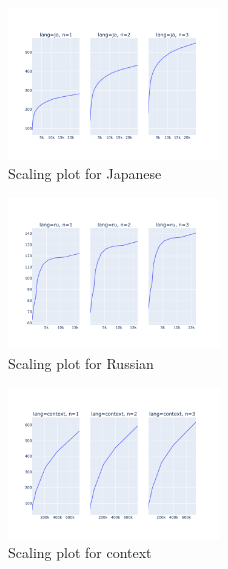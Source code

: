 \documentclass[11pt]{article}
\begin{document}
\begin{figure}[ht]
    \centering
    \includegraphics[width=0.5\textwidth]{week2_scaling_ja.png}
    \caption{Scaling plot for Japanese}
    \label{fig:week2_scaling_ja}
\end{figure}


\begin{figure}[ht]
    \centering
    \includegraphics[width=0.5\textwidth]{week2_scaling_ru.png}
    \caption{Scaling plot for Russian}
    \label{fig:week2_scaling_ru}
\end{figure}

\begin{figure}[ht]
    \centering
    \includegraphics[width=0.5\textwidth]{week2_scaling_context.png}
    \caption{Scaling plot for context}
    \label{fig:week2_scaling_context}
\end{figure}


\end{document}
